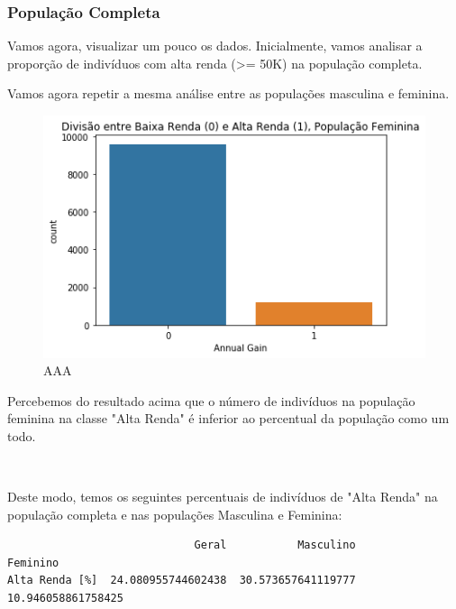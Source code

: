 \documentclass[11pt]{article}
\makeatletter
\def\maxwidth{\ifdim\Gin@nat@width>\linewidth\linewidth
    \else\Gin@nat@width\fi}
\let\Oldincludegraphics\includegraphics
\renewcommand{\includegraphics}[1]{\Oldincludegraphics[width=.8\maxwidth]{#1}}
\makeatother
\begin{document}
    \subsubsection{População Completa}\label{populauxe7uxe3o-completa}

Vamos agora, visualizar um pouco os dados. Inicialmente, vamos analisar
a proporção de indivíduos com alta renda (\textgreater{}= 50K) na
população completa.
  
       
 
    Vamos agora repetir a mesma análise entre as populações masculina e
feminina.    

\begin{figure}
\centering
\includegraphics{2019-06-04-equidade_files/2019-06-04-equidade_13_1.png}
\caption{AAA}
\end{figure}

       
    Percebemos do resultado acima que o número de indivíduos na população
feminina na classe "Alta Renda" é inferior ao percentual da população
como um todo.
    
    
    \begin{center}
    \end{center}
    { \hspace*{\fill} \\}
    
    Deste modo, temos os seguintes percentuais de indivíduos de "Alta Renda"
na população completa e nas populações Masculina e Feminina:

    
\begin{center}
\begin{verbatim}
                             Geral           Masculino            Feminino
Alta Renda [%]  24.080955744602438  30.573657641119777  10.946058861758425
    \end{verbatim}

\end{center}    
    
\end{document}
